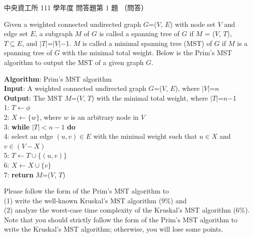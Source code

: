 \begin{pastexam}[label={px:ncu-111-dsa-13}]{中央資工所 111 學年度 問答題第 1 題}
（問答）

Given a weighted connected undirected graph $G$=($V$, $E$) with node set $V$ and edge set $E$, a
subgraph $M$ of $G$ is called a spanning tree of $G$ if $M$ = ($V$, $T$), $T\subseteq E$, and
$|T|$=$|V|$$-$1. $M$ is called a minimal spanning tree (MST) of $G$ if $M$ is a spanning tree of $G$
with the minimal total weight. Below is the Prim's MST algorithm to output the MST of a given graph
$G$.

\textbf{Algorithm}: Prim's MST algorithm\\
\textbf{Input}: A weighted connected undirected graph $G$=($V$, $E$), where $|V|$=$n$\\
\textbf{Output}: The MST $M$=($V$, $T$) with the minimal total weight, where $|T|$=$n$$-$1\\
1: $T\leftarrow\phi$\\
2: $X\leftarrow\{w\}$, where $w$ is an arbitrary node in $V$\\
3: \textbf{while} $|T| < n-1$ \textbf{do}\\
4: \quad select an edge $(u, v)\in E$ with the minimal weight such that $u\in X$ and
$v\in(V-X)$\\
5: \quad $T\leftarrow T\cup\{(u, v)\}$\\
6: \quad $X\leftarrow X\cup\{v\}$\\
7: \textbf{return} $M$=($V$, $T$)

Please follow the form of the Prim's MST algorithm to\\
(1) write the well-known Kruskal's MST algorithm (9\%) and\\
(2) analyze the worst-case time complexity of the Kruskal's MST algorithm (6\%).\\
Note that you should strictly follow the form of the Prim's MST algorithm to write the Kruskal's
MST algorithm; otherwise, you will lose some points.
\end{pastexam}

